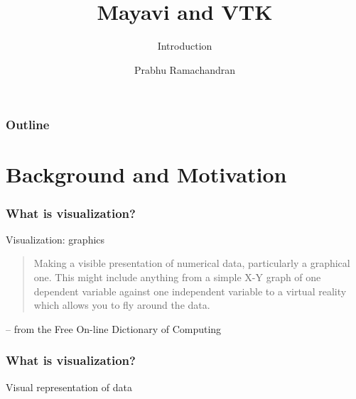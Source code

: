 

\title[Mayavi/VTK]{Mayavi and VTK}
\subtitle{Introduction}
\author[Prabhu]{Prabhu Ramachandran}

\date[] {
\small
\color{darkgreen}{NGCM Summer School\\
Southampton, UK\\
June 27--28, 2018}
}



\begin{frame}
  \maketitle
\end{frame}

\begin{frame}
  \frametitle{Outline}
  \Large
  \tableofcontents
\end{frame}

\section{Background and Motivation}

\begin{frame}
\end{frame}

\begin{frame}
  \frametitle{What is visualization?}
  \begin{block}{Visualization: graphics}
    \begin{quote}
      Making a visible presentation of numerical data, particularly a
      graphical one.  This might include anything from a simple X-Y
      graph of one dependent variable against one independent variable
      to a {virtual reality} which allows you to fly around the data.
    \end{quote}
     -- from the Free On-line Dictionary of Computing
  \end{block}
\end{frame}

\begin{frame}
    \frametitle{What is visualization?}
    \Large
    \begin{center}
    Visual representation of data
    \end{center}
\end{frame}


